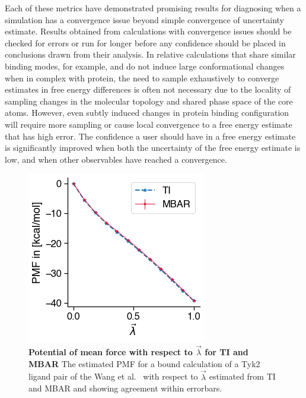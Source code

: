 \documentclass[9pt,bestpractices]{livecoms}
\begin{document}
Each of these metrics have demonstrated promising results for diagnosing when a simulation has a convergence issue beyond simple convergence of uncertainty estimate. 
Results obtained from calculations with convergence issues should be checked for errors or run for longer before any confidence should be placed in conclusions drawn from their analysis.
In relative calculations that share similar binding modes, for example, and do not induce large conformational changes when in complex with protein, the need to sample exhaustively to converge estimates in free energy differences is often not necessary due to the locality of sampling changes in the molecular topology and shared phase space of the core atoms.
However, even subtly induced changes in protein binding configuration will require more sampling or cause local convergence to a free energy estimate that has high error.
The confidence a user should have in a free energy estimate is significantly improved when both the uncertainty of the free energy estimate is low, and when other observables have reached a convergence.

\begin{figure}
    \centering
    \includegraphics[width=0.8\linewidth]{paper/figures/fig_pmf/pmf.png}
    \caption{{\bf Potential of mean force with respect to $\vec{\lambda}$ for TI and MBAR}
    The estimated PMF for a bound calculation of a Tyk2 ligand pair of the Wang et al.~\cite{wang2015accurate} with respect to $\vec{\lambda}$ estimated from TI and MBAR and showing agreement within errorbars. 
    }
    \label{fig:pmf}
\end{figure}
\end{document}
